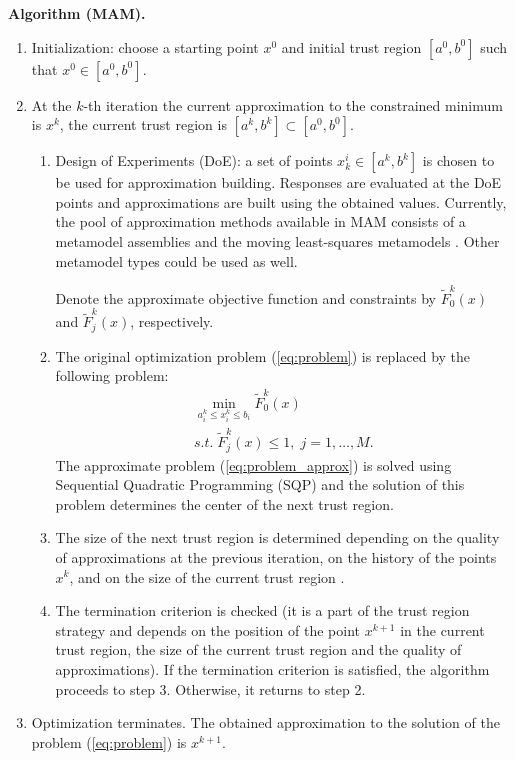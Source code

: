 \documentclass[runningheads,a4paper]{llncs}
\begin{document}
\textbf{Algorithm (MAM).}
\begin{enumerate}
\item Initialization: choose a starting point $ x^0$ and initial trust region $[ a^0,  b^0]$ such that $ x^0 \in [ a^0,  b^0]$.
\item At the $k$-th iteration the current approximation to the constrained minimum is $ x^k$, the current trust region is $[ a^k,  b^k] \subset [ a^0,  b^0]$.
  \begin{enumerate}[label=(\alph*)]
    \item Design of Experiments (DoE): a set of points $ x_k^i \in [ a^k,  b^k]$ is chosen to be used for approximation building. Responses are evaluated at the DoE points and approximations are built using the obtained values. Currently, the pool of approximation methods available in MAM consists of a metamodel assemblies \cite{PolynkinToropov2012} and the moving least-squares metamodels \cite{LancasterSalkauskas1981,Liszka1984,ChoiYounYang2001,ToropovSchrammSahaiJones2005}. Other metamodel types could be used as well.

    Denote the approximate objective function and constraints by $\widetilde{F}^k_0(x)$ and $\widetilde{F}^k_j(x)$, respectively.
    \item The original optimization problem (\ref{eq:problem}) is replaced by the following problem:
    \begin{equation}
      \label{eq:problem_approx}
      \begin{array}{c}
      \min\limits_{a_i^k \le x_i ^k\le b_i}\widetilde{F}^k_0(x) \\
      s.t.\; \widetilde{F}^k_j( x) \le 1,\; j=1,\dots ,M.
      \end{array}
    \end{equation}
    The approximate problem (\ref{eq:problem_approx}) is solved using Sequential Quadratic Programming (SQP) and the solution of this problem determines the center of the next trust region.
    \item The size of the next trust region is determined depending on the quality of approximations at the previous iteration, on the history of the points $ x^k$, and on the size of the current trust region \cite{KeulenToropovMarkine1996}.
    \item The termination criterion is checked (it is a part of the trust region strategy and depends on the position of the point $ x^{k+1}$ in the current trust region, the size of the current trust region and the quality of approximations). If the termination criterion is satisfied, the algorithm proceeds to step 3. Otherwise, it returns to step 2.
  \end{enumerate}
  \item Optimization terminates. The obtained approximation to the solution of the problem (\ref{eq:problem}) is $ x^{k+1}$.
\end{enumerate}
\end{document}
